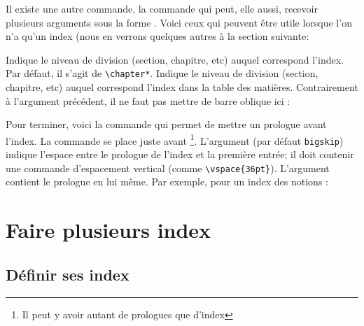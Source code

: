 Il existe une autre commande, la commande  qui peut, elle aussi, recevoir plusieurs arguments sous la forme
. Voici ceux qui peuvent être utile lorsque l'on n'a qu'un index (nous en verrons quelques autres à la section suivante:
\begin{fieldlist}
 Indique le niveau de division (section, chapitre, etc) auquel correspond l'index. Par défaut, il s'agit de \verb|\chapter*|.
 Indique le niveau de division (section, chapitre, etc) auquel correspond l'index dans la table des matières.  Contrairement à l'argument précédent, il ne faut pas mettre de barre oblique ici :

\begin{latexcode}
\indexsetup[level=\section*, toclevel=section]
\end{latexcode}
\end{fieldlist}


Pour terminer, voici la commande  qui permet de mettre un prologue avant l'index. La commande se place juste avant \footnote{Il peut y avoir autant de prologues que d'index}. L'argument  (par défaut \verb|bigskip|) indique l'espace   entre le prologue de l'index et la première entrée; il doit contenir  une commande d'espacement vertical (comme  \verb|\vspace{36pt}|). L'argument  contient le prologue en lui même. Par exemple, pour un index des notions :

\begin{latexcode}
\printindex
\end{latexcode}


\section{Faire plusieurs index}


\subsection{Définir ses index}

